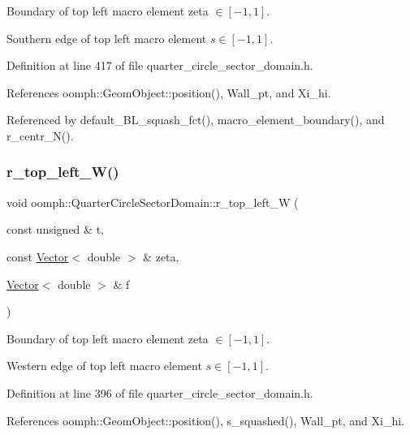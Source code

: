 Boundary of top left macro element zeta $ \in [-1,1] $. 

Southern edge of top left macro element $ s \in [-1,1] $. 

Definition at line 417 of file quarter\+\_\+circle\+\_\+sector\+\_\+domain.\+h.



References oomph\+::\+Geom\+Object\+::position(), Wall\+\_\+pt, and Xi\+\_\+hi.



Referenced by default\+\_\+\+B\+L\+\_\+squash\+\_\+fct(), macro\+\_\+element\+\_\+boundary(), and r\+\_\+centr\+\_\+\+N().

\mbox{\label{classoomph_1_1QuarterCircleSectorDomain_a84f4970adc3a93392ef1a57f19df96a1}} 
\subsubsection{\texorpdfstring{r\+\_\+top\+\_\+left\+\_\+\+W()}{r\_top\_left\_W()}}
{\footnotesize\ttfamily void oomph\+::\+Quarter\+Circle\+Sector\+Domain\+::r\+\_\+top\+\_\+left\+\_\+W (\begin{DoxyParamCaption}\item[{const unsigned \&}]{t,  }\item[{const \hyperlink{classoomph_1_1Vector}{Vector}$<$ double $>$ \&}]{zeta,  }\item[{\hyperlink{classoomph_1_1Vector}{Vector}$<$ double $>$ \&}]{f }\end{DoxyParamCaption})\hspace{0.3cm}{\ttfamily [private]}}



Boundary of top left macro element zeta $ \in [-1,1] $. 

Western edge of top left macro element $s \in [-1,1] $. 

Definition at line 396 of file quarter\+\_\+circle\+\_\+sector\+\_\+domain.\+h.



References oomph\+::\+Geom\+Object\+::position(), s\+\_\+squashed(), Wall\+\_\+pt, and Xi\+\_\+hi.



